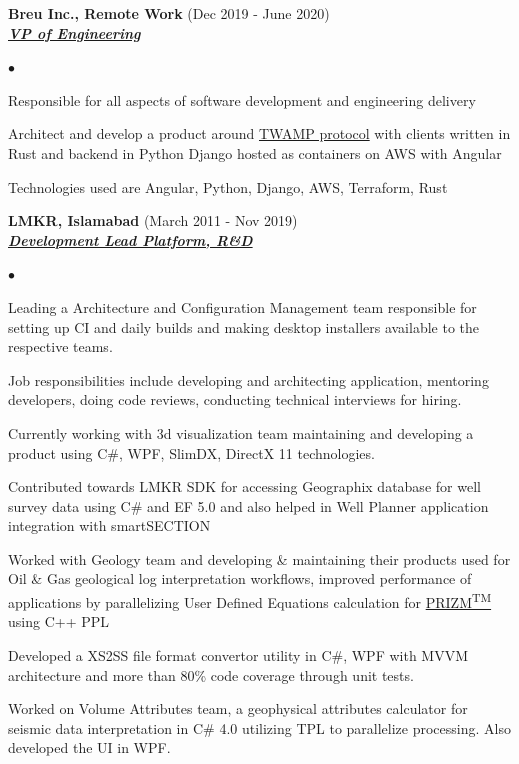\documentclass{article}
\newcommand{\employer}[3]{{ \textbf{#1} (#2)\\ \underline{\textbf{\emph{#3}}}\\  }}
\newenvironment{achievements}{\begin{list}{$\bullet$}{\topsep 0pt \itemsep -2pt}}{\vspace*{4pt}\end{list}}
\begin{document}
\employer{Breu Inc., Remote Work}{Dec 2019 - June 2020}{VP of Engineering}
	\begin{achievements}
	\item Responsible for all aspects of software development and engineering delivery
	\item Architect and develop a product around \href{https://tools.ietf.org/html/rfc5357}{TWAMP protocol} with clients written in Rust and backend in Python Django hosted as containers on AWS with Angular 
	\item Technologies used are Angular, Python, Django, AWS, Terraform, Rust
	\end{achievements}

\employer{LMKR, Islamabad}{March 2011 - Nov 2019}{Development Lead Platform, R\&D}
	\begin{achievements}
	\item Leading a Architecture and Configuration Management team responsible for setting up CI and daily builds and making desktop installers available to the respective teams.
	\item Job responsibilities include developing and architecting application, mentoring developers, doing code reviews, conducting technical interviews for hiring. 
	\item Currently working with 3d visualization team maintaining and developing a product using C\#, WPF, SlimDX, DirectX 11 technologies.
	\item Contributed towards LMKR SDK for accessing Geographix database for well survey data using C\# and EF 5.0 and also helped in Well Planner application integration with smartSECTION
	\item Worked with Geology team and developing \& maintaining their products used for Oil \& Gas geological log interpretation workflows, improved performance of applications by parallelizing User Defined Equations calculation for \href{http://www.lmkr.com/geographix/by-solution/geographix-suite/prizm%E2%84%A2/}{PRIZM\textsuperscript{TM}} using C++ PPL 
	\item Developed a XS2SS file format convertor utility in C\#, WPF with MVVM architecture and more than 80\% code coverage through unit tests.
	\item Worked on Volume Attributes team, a geophysical attributes calculator for seismic data interpretation in C\# 4.0 utilizing TPL to parallelize processing. Also developed the UI in WPF.  
	\end{achievements}
\end{document}
